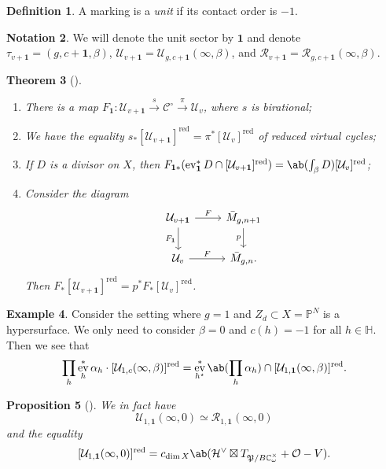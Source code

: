 \documentclass{amsart}
\newtheorem{thm}{Theorem}[section]
\newtheorem{prop}[thm]{Proposition}
\theoremstyle{definition}
\newtheorem{defn}[thm]{Definition}
\newtheorem{exm}[thm]{Example}
\newtheorem{notn}[thm]{Notation}
\theoremstyle{remark}
\theoremstyle{plain}
\theoremstyle{definition}
\theoremstyle{remark}
\newcommand{\C}{\mathbb{C}}
\renewcommand{\H}{\mathbb{H}}
\renewcommand{\P}{\mathbb{P}}
\newcommand{\mc}[1]{\mathcal{#1}}
\newcommand{\mf}[1]{\mathfrak{#1}}
\newcommand{\mr}[1]{\mathrm{#1}}
\newcommand{\on}[1]{\operatorname{#1}}
\newcommand{\1}{\mathbf{1}}
\newcommand{\2}{\mathbf{2}}
\newcommand{\3}{\mathbf{3}}
\DeclareMathOperator{\ev}{ev}
\begin{document}
\begin{defn}
    A marking is a \textit{unit} if its contact order is \(-1\).
\end{defn}

\begin{notn}
    We will denote the unit sector by \(\1\) and denote \(\tau_{v+\1} = (g, c+\1, \beta)\), \(\mc{U}_{v+\1} = \mc{U}_{g, c+\1}(\infty, \beta)\), and \(\mc{R}_{v+\1} = \mc{R}_{g, c+\1}(\infty, \beta)\).
\end{notn}

\begin{thm}[{\cite[Theorems~1.16--1.17]{CJRpunctured}}]\leavevmode
    \begin{enumerate}
        \item There is a map \(F_{\1} \colon \mc{U}_{v+\1} \xrightarrow{s} \mc{C}^{\circ} \xrightarrow{\pi} \mc{U}_v\), where \(s\) is birational;
        \item We have the equality \(s_* [\mc{U}_{v+\1}]^{\on{red}} = \pi^* [\mc{U}_v]^{\on{red}}\) of reduced virtual cycles;
        \item If \(D\) is a divisor on \(X\), then \(F_{\1 *} (\ev_{\1}^* D \cap [\mc{U}_{v+\1}]^{\on{red}}) = \ab(\int_{\beta} D) [\mc{U}_v]^{\on{red}}\); 
        \item Consider the diagram
            \begin{equation*}
            \begin{tikzcd}
                \mc{U}_{v+\1} \ar{r}{F} \ar{d}[swap]{F_{\1}} & \bar{M}_{g,n+1} \ar{d}[swap]{p} \\
                \mc{U}_v \ar{r}{F} & \bar{M}_{g,n}.
            \end{tikzcd}
            \end{equation*}
            Then \(F_* [\mc{U}_{v+\1}]^{\on{red}} = p^* F_* [\mc{U}_v]^{\on{red}}\).
    \end{enumerate}
\end{thm}

\begin{exm}
    Consider the setting where \(g = 1\) and \(Z_d \subset X = \P^N\) is a hypersurface. We only need to consider \(\beta = 0\) and \(c(h) = -1\) for all \(h \in \H\). Then we see that
    \[ \prod_h \ev_h^* \alpha_h \cdot [\mc{U}_{1,c}(\infty,\beta)]^{\mr{red}} = \ev_{h^{\star}}^* \ab(\prod_h \alpha_h) \cap [\mc{U}_{1,\1}(\infty,\beta)]^{\on{red}}. \]
\end{exm}

\begin{prop}[{\cite{CJRpunctured}}]
    We in fact have
    \[ \mc{U}_{1,\1}(\infty, 0) \simeq \mc{R}_{1,\1}(\infty, 0) \]
    and the equality
    \[ [\mc{U}_{1,\1}(\infty, 0)]^{\on{red}} = c_{\dim X} \ab(\mc{H}^{\vee} \boxtimes T_{\mf{P}/B\C_{\omega}^{\times}} + \mc{O} - V). \]
\end{prop}
\end{document}
